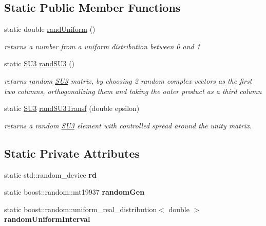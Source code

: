\subsection*{Static Public Member Functions}
\begin{DoxyCompactItemize}
\item 
static double \hyperlink{classRandom_a85d1fc4b7dd6a2a659c02101a87f7a46}{rand\+Uniform} ()\hypertarget{classRandom_a85d1fc4b7dd6a2a659c02101a87f7a46}{}\label{classRandom_a85d1fc4b7dd6a2a659c02101a87f7a46}

\begin{DoxyCompactList}\small\item\em returns a number from a uniform distribution between 0 and 1 \end{DoxyCompactList}\item 
static \hyperlink{structSU3}{S\+U3} \hyperlink{classRandom_ac5292fc838c1321ef8657947456a3970}{rand\+S\+U3} ()\hypertarget{classRandom_ac5292fc838c1321ef8657947456a3970}{}\label{classRandom_ac5292fc838c1321ef8657947456a3970}

\begin{DoxyCompactList}\small\item\em returns random \hyperlink{structSU3}{S\+U3} matrix, by choosing 2 random complex vectors as the first two columns, orthogonalizing them and taking the outer product as a third column \end{DoxyCompactList}\item 
static \hyperlink{structSU3}{S\+U3} \hyperlink{classRandom_a1999be7abe21383e442a5ef96fe836f4}{rand\+S\+U3\+Transf} (double epsilon)
\begin{DoxyCompactList}\small\item\em returns a random \hyperlink{structSU3}{S\+U3} element with controlled spread around the unity matrix. \end{DoxyCompactList}\end{DoxyCompactItemize}
\subsection*{Static Private Attributes}
\begin{DoxyCompactItemize}
\item 
static std\+::random\+\_\+device {\bfseries rd}\hypertarget{classRandom_a7206399225b174d8a582fbe005fdd147}{}\label{classRandom_a7206399225b174d8a582fbe005fdd147}

\item 
static boost\+::random\+::mt19937 {\bfseries random\+Gen}\hypertarget{classRandom_a87c5a2f785d8bc7ee8710c90be207e0f}{}\label{classRandom_a87c5a2f785d8bc7ee8710c90be207e0f}

\item 
static boost\+::random\+::uniform\+\_\+real\+\_\+distribution$<$ double $>$ {\bfseries random\+Uniform\+Interval}\hypertarget{classRandom_a8855414604d169c7a0a3b283f353a315}{}\label{classRandom_a8855414604d169c7a0a3b283f353a315}

\end{DoxyCompactItemize}


